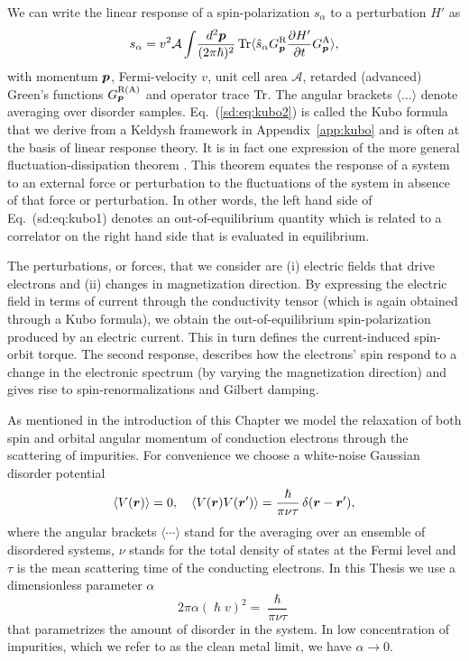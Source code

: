 We can write the linear response of a spin-polarization $s_\alpha$ to a perturbation $H'$ as
\begin{equation}
	s_\alpha = v^2\mathcal{A}\int\!\frac{d^2\boldsymbol{p}}{(2\pi\hslash)^2}\operatorname{Tr} \langle \hat{s}_\alpha G^\text{R}_{\boldsymbol{p}} \frac{\partial H'}{\partial t} G^\text{A}_{\boldsymbol{p}}\rangle,
\label{sd:eq:kubo2}
\end{equation}
with momentum $\boldsymbol{p}$, Fermi-velocity $v$, unit cell area $\mathcal{A}$, retarded (advanced) Green's functions $G^\text{R(A)}_{\boldsymbol{p}}$ and operator trace $\operatorname{Tr}$. The angular brackets $\langle\dots\rangle$ denote averaging over disorder samples. Eq.~(\ref{sd:eq:kubo2}) is called the Kubo formula that we derive from a Keldysh framework in Appendix~\ref{app:kubo} and is often at the basis of linear response theory. It is in fact one expression of the more general fluctuation-dissipation theorem \cite{Kubo_1966}. This theorem equates the response of a system to an external force or perturbation to the fluctuations of the system in absence of that force or perturbation. In other words, the left hand side of Eq.~(sd:eq:kubo1) denotes an out-of-equilibrium quantity which is related to a correlator on the right hand side that is evaluated in equilibrium. 

The perturbations, or forces, that we consider are (i) electric fields that drive electrons and (ii) changes in magnetization direction. By expressing the electric field in terms of current through the conductivity tensor (which is again obtained through a Kubo formula), we obtain the out-of-equilibrium spin-polarization produced by an electric current. This in turn defines the current-induced spin-orbit torque. The second response, describes how the electrons' spin respond to a change in the electronic spectrum (by varying the magnetization direction) and gives rise to spin-renormalizations and Gilbert damping. 

As mentioned in the introduction of this Chapter we model the relaxation of both spin and orbital angular momentum of conduction electrons through the scattering of impurities. For convenience we choose a white-noise Gaussian disorder potential
\begin{equation}
    \label{disorder}
\langle V(\boldsymbol{r})\rangle =0,\quad \langle V(\boldsymbol{r}) V(\boldsymbol{r}') \rangle = \frac{\hslash}{\pi\nu\tau}\,\delta(\boldsymbol{r}-\boldsymbol{r}'),
\end{equation}
where the angular brackets $\langle\cdots\rangle$ stand for the averaging over an ensemble of disordered systems, $\nu$ stands for the total density of states at the Fermi level and $\tau$ is the mean scattering time of the conducting electrons. In this Thesis we use a dimensionless parameter $\alpha$
\begin{equation}
     2 \pi\alpha (\hslash v)^2 = \frac{\hslash}{\pi\nu\tau}
\end{equation}
that parametrizes the amount of disorder in the system. In low concentration of impurities, which we refer to as the clean metal limit, we have $\alpha\rightarrow0$. 

